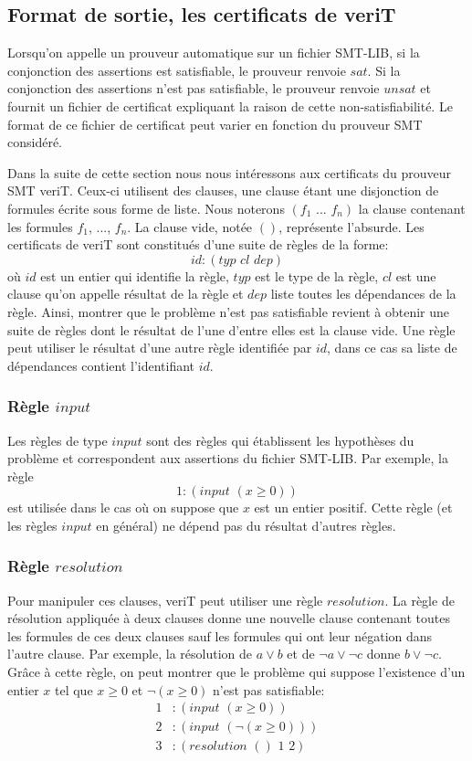 \documentclass[11pt]{article}
\begin{document}
\subsection{Format de sortie, les certificats de veriT} \label{sortie}

Lorsqu'on appelle un prouveur automatique sur un fichier SMT-LIB, si la conjonction des assertions est satisfiable, le prouveur renvoie $sat$. Si la conjonction des assertions n'est pas satisfiable, le prouveur renvoie $unsat$ et fournit un fichier de certificat expliquant la raison de cette non-satisfiabilité. Le format de ce fichier de certificat peut varier en fonction du prouveur SMT considéré. \medbreak

Dans la suite de cette section nous nous intéressons aux certificats du prouveur SMT veriT. Ceux-ci utilisent des clauses, une clause étant une disjonction de formules écrite sous forme de liste. Nous noterons $(f_1 \,\,  ... \,\, f_n)$ la clause contenant les formules $f_1$, ..., $f_n$. La clause vide, notée $()$, représente l'absurde. Les certificats de veriT sont constitués d'une suite de règles de la forme: 
\[id:(typ \,\, cl \,\, dep)\] 
où $id$ est un entier qui identifie la règle, $typ$ est le type de la règle, $cl$ est une clause qu'on appelle résultat de la règle et $dep$ liste toutes les dépendances de la règle.  Ainsi, montrer que le problème n'est pas satisfiable revient à obtenir une suite de règles dont le résultat de l'une d'entre elles est la clause vide. Une règle peut utiliser le résultat d'une autre règle identifiée par $id$, dans ce cas sa liste de dépendances contient l'identifiant $id$.

\subsubsection{Règle $input$}

Les règles de type $input$ sont des règles qui établissent les hypothèses du problème et correspondent aux assertions du fichier SMT-LIB. Par exemple, la règle 
\[ 1:(input \,\, (x \geq 0)) \]
est utilisée dans le cas où on suppose que $x$ est un entier positif. Cette règle (et les règles $input$ en général) ne dépend pas du résultat d'autres règles.\medbreak

\subsubsection{Règle $resolution$}

Pour manipuler ces clauses, veriT peut utiliser une règle $resolution$. La règle de résolution appliquée à deux clauses donne une nouvelle clause contenant toutes les formules de ces deux clauses sauf les formules qui ont leur négation dans l'autre clause. Par exemple, la résolution de $a \vee b$ et de $\neg a \vee \neg c$ donne $b \vee \neg c$. Grâce à cette règle, on peut montrer que le problème qui suppose l'existence d'un entier $x$ tel que $x \geq 0$ et $\neg (x \geq 0)$ n'est pas satisfiable: 
\begin{align*}
1&:(input \,\, ( x \geq 0)) \\
2&:(input \,\, (\neg (x \geq 0))) \\
3&:(resolution \,\,() \,\,1\,\, 2)
\end{align*}
\end{document}
